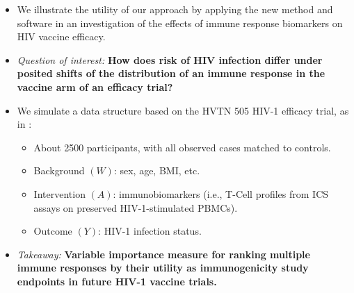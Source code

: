\documentclass[landscape,a0paper,fontscale=0.285]{baposter} %
\newcommand{\compresslist}{ %
\setlength{\itemsep}{1pt}
\setlength{\parskip}{0pt}
\setlength{\parsep}{0pt}
}
\begin{document}
\begin{poster}
{\begin{itemize}\compresslist
\setlength\itemsep{0.5em}
\item We illustrate the utility of our approach by applying the new method and
  software in an investigation of the effects of immune response biomarkers on
  HIV vaccine efficacy.
\item \textit{Question of interest:} \textbf{How does risk of HIV infection
   differ under posited shifts of the distribution of an immune response in the
   vaccine arm of an efficacy trial?}
\item We simulate a data structure based on the HVTN 505 HIV-1 efficacy trial,
  as in \cite{janes2017higher}:
  \begin{itemize}
    \itemsep0.5pt
    \item About 2500 participants, with all observed cases matched to controls.
    \item Background $(W)$: sex, age, BMI, etc.
    \item Intervention $(A)$: immunobiomarkers (i.e., T-Cell profiles from ICS
      assays on preserved HIV-1-stimulated PBMCs).
    \item Outcome $(Y)$: HIV-1 infection status.
  \end{itemize}
\item \textit{Takeaway:} \textbf{Variable importance measure for ranking
   multiple immune responses by their utility as immunogenicity study endpoints
   in future HIV-1 vaccine trials.}
\end{itemize}
}


\end{poster}
\end{document}
